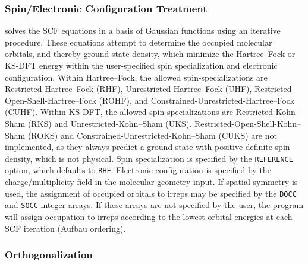 \subsubsection{Spin/Electronic Configuration Treatment}

\PSIfour solves the SCF equations in a basis of Gaussian functions using an
iterative procedure. These equations attempt to determine the occupied molecular
orbitals, and thereby ground state density, which minimize the Hartree--Fock or
KS-DFT energy within the user-specified spin specialization and electronic
configuration. Within Hartree--Fock, the allowed spin-specializations are
Restricted-Hartree--Fock (RHF), Unrestricted-Hartree--Fock (UHF),
Restricted-Open-Shell-Hartree--Fock (ROHF), and
Constrained-Unrestricted-Hartree--Fock (CUHF). Within KS-DFT, the allowed
spin-specializations are Restricted-Kohn--Sham (RKS) and Unrestricted-Kohn--Sham
(UKS). Restricted-Open-Shell-Kohn--Sham (ROKS) and
Constrained-Unrestricted-Kohn--Sham (CUKS) are not implemented, as they always
predict a ground state with positive definite spin density, which is not
physical. Spin specialization is specified by the \texttt{REFERENCE} option,
which defaults to \texttt{RHF}.  Electronic configuration is specified by the
charge/multiplicity field in the molecular geometry input.  If spatial symmetry
is used, the assignment of occupied orbitals to irreps may be specified by the
\texttt{DOCC} and \texttt{SOCC} integer arrays. If these arrays are not
specified by the user, the program will assign occupation to irreps according to
the lowest orbital energies at each SCF iteration (Aufbau ordering).  

\subsubsection{Orthogonalization}

